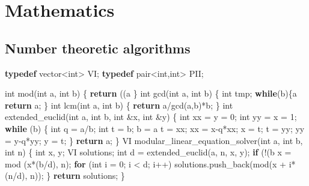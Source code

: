 \documentclass[10pt,]{article}
\newenvironment{Shaded}{}{}
\newcommand{\KeywordTok}[1]{\textcolor[rgb]{0.00,0.44,0.13}{\textbf{{#1}}}}
\newcommand{\DataTypeTok}[1]{\textcolor[rgb]{0.56,0.13,0.00}{{#1}}}
\newcommand{\DecValTok}[1]{\textcolor[rgb]{0.25,0.63,0.44}{{#1}}}
\newcommand{\NormalTok}[1]{{#1}}
\begin{document}
\section{Mathematics}

\subsection{Number theoretic algorithms}

\begin{Shaded}
\begin{Highlighting}[]
\KeywordTok{typedef} \NormalTok{vector<}\DataTypeTok{int}\NormalTok{> VI;}
\KeywordTok{typedef} \NormalTok{pair<}\DataTypeTok{int}\NormalTok{,}\DataTypeTok{int}\NormalTok{> PII;}

\DataTypeTok{int} \NormalTok{mod(}\DataTypeTok{int} \NormalTok{a, }\DataTypeTok{int} \NormalTok{b) \{}
  \KeywordTok{return} \NormalTok{((a%b)+b)%b;}
\NormalTok{\}}
\DataTypeTok{int} \NormalTok{gcd(}\DataTypeTok{int} \NormalTok{a, }\DataTypeTok{int} \NormalTok{b) \{}
  \DataTypeTok{int} \NormalTok{tmp;}
  \KeywordTok{while}\NormalTok{(b)\{a%=b; tmp=a; a=b; b=tmp;\}}
  \KeywordTok{return} \NormalTok{a;}
\NormalTok{\}}
\DataTypeTok{int} \NormalTok{lcm(}\DataTypeTok{int} \NormalTok{a, }\DataTypeTok{int} \NormalTok{b) \{}
  \KeywordTok{return} \NormalTok{a/gcd(a,b)*b;}
\NormalTok{\}}
\DataTypeTok{int} \NormalTok{extended_euclid(}\DataTypeTok{int} \NormalTok{a, }\DataTypeTok{int} \NormalTok{b, }\DataTypeTok{int} \NormalTok{&x, }\DataTypeTok{int} \NormalTok{&y) \{}
  \DataTypeTok{int} \NormalTok{xx = y = }\DecValTok{0}\NormalTok{;}
  \DataTypeTok{int} \NormalTok{yy = x = }\DecValTok{1}\NormalTok{;}
  \KeywordTok{while} \NormalTok{(b) \{}
    \DataTypeTok{int} \NormalTok{q = a/b;}
    \DataTypeTok{int} \NormalTok{t = b; b = a%b; a = t;}
    \NormalTok{t = xx; xx = x-q*xx; x = t;}
    \NormalTok{t = yy; yy = y-q*yy; y = t;}
  \NormalTok{\}}
  \KeywordTok{return} \NormalTok{a;}
\NormalTok{\}}
\NormalTok{VI modular_linear_equation_solver(}\DataTypeTok{int} \NormalTok{a, }\DataTypeTok{int} \NormalTok{b, }\DataTypeTok{int} \NormalTok{n) \{}
  \DataTypeTok{int} \NormalTok{x, y;}
  \NormalTok{VI solutions;}
  \DataTypeTok{int} \NormalTok{d = extended_euclid(a, n, x, y);}
  \KeywordTok{if} \NormalTok{(!(b%d)) \{}
    \NormalTok{x = mod (x*(b/d), n);}
    \KeywordTok{for} \NormalTok{(}\DataTypeTok{int} \NormalTok{i = }\DecValTok{0}\NormalTok{; i < d; i++)}
      \NormalTok{solutions.push_back(mod(x + i*(n/d), n));}
  \NormalTok{\}}
  \KeywordTok{return} \NormalTok{solutions;}
\NormalTok{\}}
}}}}
\end{Highlighting}
\end{Shaded}
\end{document}
